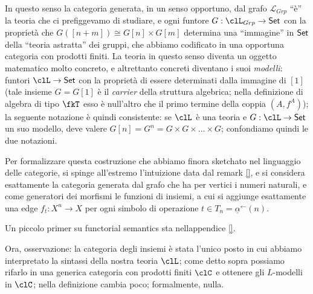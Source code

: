 \documentclass{amsart}
\begin{document}


In questo senso la categoria generata, in un senso opportuno, dal grafo $\mathcal{L}_{Grp}$ ``è'' la teoria che ci prefiggevamo di studiare, e ogni funtore $G: \clL_{Grp} \to \Set$ con la proprietà che $G([n+m]) \cong G[n] \times G[m]$ determina una ``immagine'' in $\mathsf{Set}$ della ``teoria astratta'' dei gruppi, che abbiamo codificato in una opportuna categoria con prodotti finiti. La teoria in questo senso diventa un oggetto matematico molto concreto, e altrettanto concreti diventano i suoi \emph{modelli}: funtori $\clL \to \Set$ con la proprietà di essere determinati dalla immagine di $[1]$ (tale insieme $G=G[1]$ è il \emph{carrier} della struttura algebrica; nella definizione di algebra di tipo $\fkT$ esso è null'altro che il primo termine della coppia $(A,f^A)$);  la seguente notazione è quindi consistente: se $\clL$ è una teoria e $G : \clL \to \Set$ un suo modello, deve valere $G[n]=G^n = G \times G \times\dots\times G$; confondiamo quindi le due notazioni.

Per formalizzare questa costruzione che abbiamo finora sketchato nel linguaggio delle categorie, si spinge all'estremo l'intuizione data dal remark \ref{}, e si considera esattamente la categoria generata dal grafo che ha per vertici i numeri naturali, e come generatori dei morfismi le funzioni di insiemi, a cui si aggiunge esattamente una edge $f_t : X^n \to X$ per ogni simbolo di operazione $t \in T_n = \underline{\alpha}^\leftarrow(n)$.

Un piccolo primer su functorial semantics sta nellappendice \ref{}.

Ora, osservazione: la categoria degli insiemi è stata l'unico posto in cui abbiamo interpretato la sintassi della nostra teoria $\clL$; come detto sopra possiamo rifarlo in una generica categoria con prodotti finiti $\clC$ e ottenere gli $L$-modelli in $\clC$; nella definizione cambia poco; formalmente, nulla. 
\end{document}
